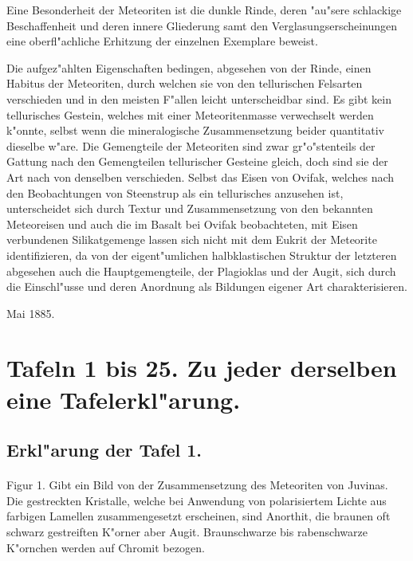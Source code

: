 \documentclass[a4paper, 11pt, oneside, polutonikogreek, german]{article}
\begin{document}
Eine Besonderheit der Meteoriten ist die dunkle Rinde, deren "au"sere schlackige Beschaffenheit und deren innere Gliederung samt den Verglasungserscheinungen eine oberfl"achliche Erhitzung der einzelnen Exemplare beweist.

Die aufgez"ahlten Eigenschaften bedingen, abgesehen von der Rinde, einen Habitus der Meteoriten, durch welchen sie von den tellurischen Felsarten verschieden und in den meisten F"allen leicht unterscheidbar sind. Es gibt kein tellurisches Gestein, welches mit einer Meteoritenmasse verwechselt werden k"onnte, selbst wenn die mineralogische Zusammensetzung beider quantitativ dieselbe w"are. Die Gemengteile der Meteoriten sind zwar gr"o"stenteils der Gattung nach den Gemengteilen tellurischer Gesteine gleich, doch sind sie der Art nach von denselben verschieden. Selbst das Eisen von Ovifak, welches nach den Beobachtungen von Steenstrup als ein tellurisches anzusehen ist, unterscheidet sich durch Textur und Zusammensetzung von den bekannten Meteoreisen und auch die im Basalt bei Ovifak beobachteten, mit Eisen verbundenen Silikatgemenge lassen sich nicht mit dem Eukrit der Meteorite identifizieren, da von der eigent"umlichen halbklastischen Struktur der letzteren abgesehen auch die Hauptgemengteile, der Plagioklas und der Augit, sich durch die Einschl"usse und deren Anordnung als Bildungen eigener Art charakterisieren.

Mai 1885.
\clearpage
\pagestyle{fancy}
\fancyhf{}
\cfoot{\swabfamily{\thepage}}
\section{Tafeln 1 bis 25. Zu jeder derselben eine Tafelerkl"arung.}
\subsection{Erkl"arung der Tafel 1.}
\paragraph{}
Figur 1. Gibt ein Bild von der Zusammensetzung des Meteoriten von Juvinas. Die gestreckten Kristalle, welche bei Anwendung von polarisiertem Lichte aus farbigen Lamellen zusammengesetzt erscheinen, sind Anorthit, die braunen oft schwarz gestreiften K"orner aber Augit. Braunschwarze bis rabenschwarze K"ornchen werden auf Chromit bezogen.
\end{document}

